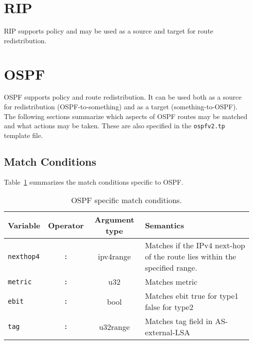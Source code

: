 \section{RIP}
RIP supports policy and may be used as a source and target for route
redistribution.

\section{OSPF}
OSPF supports policy and route redistribution.  It can be used both as
a source for redistribution (OSPF-to-something) and as a target
(something-to-OSPF). The following sections summarize which aspects of
OSPF routes may be matched and what actions may be taken. These are
also specified in the {\tt ospfv2.tp} template file.

\subsection{Match Conditions}
Table~\ref{policy_ospf_match} summarizes the match conditions specific to OSPF.
\begin{table}[h]
\centering
\begin{tabular}{|l|c|c|p{7cm}|}
\hline
Variable & Operator & Argument type & Semantics \\
\hline\hline
{\tt nexthop4} & {\tt :} & ipv4range & Matches if the IPv4 next-hop of the route
lies within the specified range.\\

\hline
{\tt metric} & {\tt :} & u32 & Matches metric \\
\hline

\hline
{\tt ebit} & {\tt :} & bool & Matches ebit true for type1 false for type2 \\
\hline

\hline
{\tt tag} & {\tt :} & u32range & Matches tag field in AS-external-LSA \\
\hline

\end{tabular}
\caption{\label{policy_ospf_match}OSPF specific match conditions.}
\end{table}

